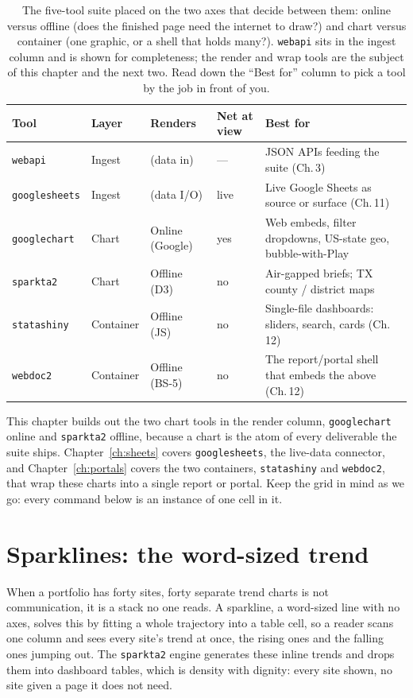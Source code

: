 \documentclass[
    a4paper,
    fontsize=10pt,
    twoside=true,
    numbers=noenddot,
]{kaobook}
\begin{document}
\begin{table}[htbp]
\centering
\caption[The visualization suite at a glance]{The five-tool suite placed on the two axes that decide between them: online versus offline (does the finished page need the internet to draw?) and chart versus container (one graphic, or a shell that holds many?). \texttt{webapi} sits in the ingest column and is shown for completeness; the render and wrap tools are the subject of this chapter and the next two. Read down the \enquote{Best for} column to pick a tool by the job in front of you.}
\label{tab:suite-matrix}
{\footnotesize
\begin{tabular}{lllll}
\hline
Tool & Layer & Renders & Net at view & Best for \\
\hline
\texttt{webapi}      & Ingest    & (data in)      & ---  & JSON APIs feeding the suite (Ch.\,3) \\
\texttt{googlesheets}& Ingest    & (data I/O)     & live & Live Google Sheets as source or surface (Ch.\,11) \\
\texttt{googlechart} & Chart     & Online (Google)& yes  & Web embeds, filter dropdowns, US-state geo, bubble-with-Play \\
\texttt{sparkta2}    & Chart     & Offline (D3)   & no   & Air-gapped briefs; TX county / district maps \\
\texttt{statashiny}  & Container & Offline (JS)   & no   & Single-file dashboards: sliders, search, cards (Ch.\,12) \\
\texttt{webdoc2}     & Container & Offline (BS-5) & no   & The report/portal shell that embeds the above (Ch.\,12) \\
\hline
\end{tabular}
}
\end{table}

This chapter builds out the two chart tools in the render column, \texttt{googlechart} online and \texttt{sparkta2} offline, because a chart is the atom of every deliverable the suite ships. Chapter~\ref{ch:sheets} covers \texttt{googlesheets}, the live-data connector, and Chapter~\ref{ch:portals} covers the two containers, \texttt{statashiny} and \texttt{webdoc2}, that wrap these charts into a single report or portal. Keep the grid in mind as we go: every command below is an instance of one cell in it.

\section{Sparklines: the word-sized trend}
When a portfolio has forty sites, forty separate trend charts is not communication, it is a stack no one reads. A sparkline, a word-sized line with no axes, solves this by fitting a whole trajectory into a table cell, so a reader scans one column and sees every site's trend at once, the rising ones and the falling ones jumping out. The \texttt{sparkta2} engine generates these inline trends and drops them into dashboard tables, which is density with dignity: every site shown, no site given a page it does not need.
\end{document}
